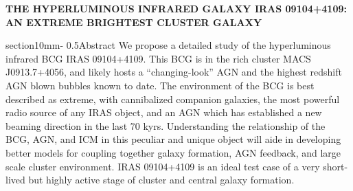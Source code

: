 \documentclass[letterpaper,12pt]{article}
\makeatletter
\renewcommand{\section}{\@startsection%
{section}{1}{0mm}{-\baselineskip}%
{0.5\baselineskip}{\normalfont\Large\bfseries}}%
\makeatother
\begin{document}
\pagestyle{plain}
\begin{center}
\bfseries\uppercase{The Hyperluminous Infrared Galaxy IRAS 09104+4109: An Extreme Brightest Cluster Galaxy}
\end{center}
\section{Abstract}
We propose a detailed study of the hyperluminous infrared BCG IRAS
09104+4109. This BCG is in the rich cluster MACS J0913.7+4056, and
likely hosts a ``changing-look'' AGN and the highest redshift AGN
blown bubbles known to date. The environment of the BCG is best
described as extreme, with cannibalized companion galaxies, the most
powerful radio source of any IRAS object, and an AGN which has
established a new beaming direction in the last 70 kyrs. Understanding
the relationship of the BCG, AGN, and ICM in this peculiar and unique
object will aide in developing better models for coupling together
galaxy formation, AGN feedback, and large scale cluster
environment. IRAS 09104+4109 is an ideal test case of a very
short-lived but highly active stage of cluster and central galaxy
formation.
\end{document}
